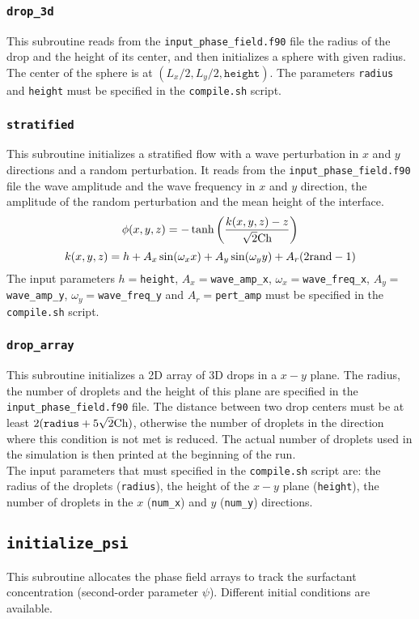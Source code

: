 \subsubsection{\texttt{drop\_3d}}
This subroutine reads from the \texttt{input\_phase\_field.f90} file the radius of the drop and the height of its center, and then initializes a sphere with given radius. The center of the sphere is at $(L_x/2,L_y/2,\texttt{height})$. The parameters \texttt{radius} and \texttt{height} must be specified in the \texttt{compile.sh} script.

\subsubsection{\texttt{stratified}}
This subroutine initializes a stratified flow with a wave perturbation in $x$ and $y$ directions and a random perturbation. It reads from the \texttt{input\_phase\_field.f90} file the wave amplitude and the wave frequency in $x$ and $y$ direction, the amplitude of the random perturbation and the mean height of the interface.
\[
\phi(x,y,z)=-\tanh\left(\frac{k(x,y,z)-z}{\sqrt{2}\textnormal{Ch}}\right)
\]
\[
k(x,y,z)=h+A_x\sin(\omega_x x)+A_y \sin(\omega_y y)+A_r(2\textnormal{rand}-1)
\]
The input parameters $h=$\texttt{height}, $A_x=$\texttt{wave\_amp\_x}, $\omega_x=$\texttt{wave\_freq\_x}, $A_y=$\texttt{wave\_amp\_y}, $\omega_y=$\texttt{wave\_freq\_y} and $A_r=$\texttt{pert\_amp} must be specified in the \texttt{compile.sh} script.

\subsubsection{\texttt{drop\_array}}
This subroutine initializes a 2D array of 3D drops in a $x-y$ plane. The radius, the number of droplets and the height of this plane are specified in the \texttt{input\_phase\_field.f90} file. The distance between two drop centers must be at least $2(\texttt{radius}+5\sqrt{2}\textnormal{Ch})$, otherwise the number of droplets in the direction where this condition is not met is reduced. The actual number of droplets used in the simulation is then printed at the beginning of the run.\\
The input parameters that must specified in the \texttt{compile.sh} script are: the radius of the droplets (\texttt{radius}), the height of the $x-y$ plane (\texttt{height}), the number of droplets in the $x$ (\texttt{num\_x}) and $y$ (\texttt{num\_y}) directions.

\subsection{\texttt{initialize\_psi}}
This subroutine allocates the phase field arrays to track the surfactant concentration (second-order parameter $\psi$).
Different initial conditions are available.

